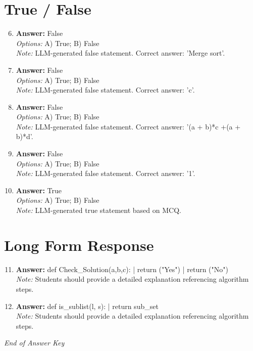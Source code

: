 \documentclass[12pt]{article}
\begin{document}
\section*{True / False}
\begin{enumerate}[label=\arabic*.]
\setcounter{enumi}{5}
\item \textbf{Answer:} False
\\ \textit{Options:} A) True; B) False
\\ \textit{Note:} LLM-generated false statement. Correct answer: 'Merge sort'.
\item \textbf{Answer:} False
\\ \textit{Options:} A) True; B) False
\\ \textit{Note:} LLM-generated false statement. Correct answer: 'c'.
\item \textbf{Answer:} False
\\ \textit{Options:} A) True; B) False
\\ \textit{Note:} LLM-generated false statement. Correct answer: '(a + b)*c +(a + b)*d'.
\item \textbf{Answer:} False
\\ \textit{Options:} A) True; B) False
\\ \textit{Note:} LLM-generated false statement. Correct answer: '1'.
\item \textbf{Answer:} True
\\ \textit{Options:} A) True; B) False
\\ \textit{Note:} LLM-generated true statement based on MCQ.
\end{enumerate}

\section*{Long Form Response}
\begin{enumerate}[label=\arabic*.]
\setcounter{enumi}{10}
\item \textbf{Answer:} def Check\_Solution(a,b,c): | return ("Yes") | return ("No")
\\ \textit{Note:} Students should provide a detailed explanation referencing algorithm steps.
\item \textbf{Answer:} def is\_sublist(l, s): | return sub\_set
\\ \textit{Note:} Students should provide a detailed explanation referencing algorithm steps.
\end{enumerate}

\vfill
\noindent\textit{End of Answer Key}
\end{document}
